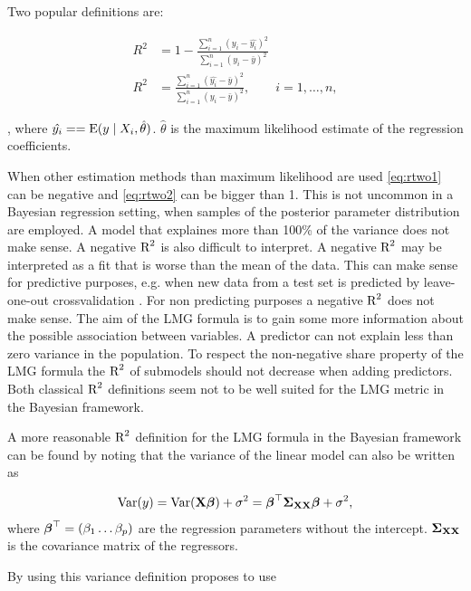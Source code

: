 \documentclass[11pt,a4paper,twoside]{book}
\begin{document}
Two popular definitions are:
   
      \begin{align} 
     R^2 &= 1 - \frac{\sum_{i=1}^{n}(y_{i} - \hat{y_{i}})^2}{\sum_{i=1}^{n}(y_{i}-\bar{y})^2}   \label{eq:rtwo1} \\
     R^2 &= \frac{\sum_{i=1}^{n}(\hat{y_{i}} - \bar{y})^2}{\sum_{i=1}^{n}(y_{i}-\bar{y})^2}, \qquad i = 1,\dots,n,   \label{eq:rtwo2} 
   \end{align} 
   
, where $\hat{y_{i}} = = \operatorname{E} ({y \mid X_{i}, \hat{\theta}})$.  $\hat{\theta}$ is the maximum likelihood estimate of the regression coefficients.


When other estimation methods than maximum likelihood are used \eqref{eq:rtwo1} can be negative and \eqref{eq:rtwo2}  can be bigger than 1. This is not uncommon in a Bayesian regression setting, when samples of the posterior parameter distribution are employed. A model that explaines more than 100\% of the variance does not make sense. A negative $\text{R}^2$ is also difficult to interpret. A negative $\text{R}^2$ may be interpreted as a fit that is worse than the mean of the data. This can make sense for predictive purposes, e.g. when new data from a test set is predicted by leave-one-out crossvalidation \citep{Alexander2015}.  For non predicting purposes a negative $\text{R}^2$ does not make sense. The aim of the LMG formula is to gain some more information about the possible association between variables. A predictor can not explain less than zero variance in the population. To respect the non-negative share property of the LMG formula the $\text{R}^2$ of submodels should not decrease when adding predictors. Both classical $\text{R}^2$ definitions seem not to be well suited for the LMG metric in the Bayesian framework.

A more reasonable $\text{R}^2$ definition for the LMG formula in the Bayesian framework can be found by noting that the variance of the linear model can also be written as 

      \begin{align} 
        \operatorname{Var}(y) = \operatorname{Var}({\mathbf{X}} {\boldsymbol{\beta}}) + \sigma^2 = {\boldsymbol{\beta}}^\top {\boldsymbol{\Sigma}}{}_{{\mathbf{X}} {\mathbf{X}}}  {\boldsymbol{\beta}} + \sigma^2, \label{eq:vary} 
   \end{align}
where ${\boldsymbol{\beta}}^\top = (\beta_{1} \dots \beta_{p})$ are the regression parameters without the intercept.
${\boldsymbol{\Sigma}}{}_{{\mathbf{X}} {\mathbf{X}}}$ is the covariance matrix of the regressors.

By using this variance definition \cite{Gelman2017} proposes to use 
\end{document}
